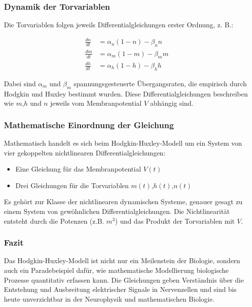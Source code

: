 \begin{refsection}
\subsubsection{Dynamik der Torvariablen}
Die Torvariablen folgen jeweils Differentialgleichungen erster Ordnung, z. B.:

\begin{align}
	\frac{dn}{dt} &= \alpha_n (1 - n) - \beta_n n \\
	\frac{dm}{dt} &= \alpha_m (1 - m) - \beta_m m \\
	\frac{dh}{dt} &= \alpha_h (1 - h) - \beta_h h 
\end{align}

Dabei sind $\alpha_m$ und $\beta_m$ spannungsgesteuerte Übergangsraten, die empirisch durch Hodgkin und Huxley bestimmt wurden.
Diese Differentialgleichungen beschreiben wie $m$,$h$ und $n$ jeweils vom Membranpotential $V$ abhängig sind.
\cite{nerven:InaLammers.31.08.2015}
\subsubsection{Mathematische Einordnung der Gleichung}
Mathematisch handelt es sich beim Hodgkin-Huxley-Modell um ein System von vier gekoppelten nichtlinearen
Differentialgleichungen:
\begin{itemize}
    \item Eine Gleichung für das Membranpotential $V(t)$
    \item Drei Gleichungen für die Torvariablen $m(t)$,$h(t)$,$n(t)$
\end{itemize}
Es gehört zur Klasse der nichtlinearen dynamischen Systeme, genauer gesagt zu einem System von gewöhnlichen Differentialgleichungen. Die Nichtlinearität entsteht durch die Potenzen (z.B. $m^3$) und das Produkt der Torvariablen mit $V$.
\subsubsection{Fazit}
Das Hodgkin-Huxley-Modell ist nicht nur ein Meilenstein der Biologie, sondern auch ein Paradebeispiel dafür, wie mathematische Modellierung biologische Prozesse quantitativ erfassen kann. Die Gleichungen geben Verständnis über die Entstehung und Ausbreitung elektrischer Signale in Nervenzellen und sind bis heute unverzichtbar in der Neurophysik und mathematischen Biologie.


\end{refsection}
